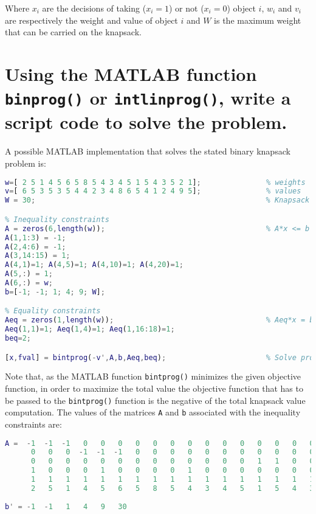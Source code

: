 Where $x_i$ are the decisions of taking ($x_i=1$) or not ($x_i=0$) object $i$, $w_i$ and $v_i$ are respectively the weight and value of object $i$ and $W$ is the maximum weight that can be carried on the knapsack. 
    
\section{Using the MATLAB function \texttt{binprog()} or \texttt{intlinprog()}, write a script code to solve the problem.}

A possible MATLAB implementation that solves the stated binary knapsack problem is:

\begin{lstlisting}[language=Matlab,frame=none]
% Object data
w=[ 2 5 1 4 5 6 5 8 5 4 3 4 5 1 5 4 3 5 2 1]; 				% weights
v=[ 6 5 3 5 3 5 4 4 2 3 4 8 6 5 4 1 2 4 9 5]; 				% values
W = 30;                                       				% Knapsack capacity

% Inequality constraints
A = zeros(6,length(w));                        				% A*x <= b
A(1,1:3) = -1;
A(2,4:6) = -1;
A(3,14:15) = 1;
A(4,1)=1; A(4,5)=1; A(4,10)=1; A(4,20)=1;
A(5,:) = 1;
A(6,:) = w;
b=[-1; -1; 1; 4; 9; W];

% Equality constraints
Aeq = zeros(1,length(w));                      				% Aeq*x = beq
Aeq(1,1)=1; Aeq(1,4)=1; Aeq(1,16:18)=1;
beq=2;

[x,fval] = bintprog(-v',A,b,Aeq,beq);						% Solve program
\end{lstlisting}

Note that, as the MATLAB function \texttt{bintprog()} minimizes the given objective function, in order to maximize the total value the objective function that has to be passed to the \texttt{bintprog()} function is the negative of the total knapsack value computation.  
\newpage
The values of the matrices \texttt{A} and \texttt{b} associated with the inequality constraints are:
\begin{lstlisting}[language=Matlab,frame=none]
A =  -1  -1  -1   0   0   0   0   0   0   0   0   0   0   0   0   0   0   0   0   0   
      0   0   0  -1  -1  -1   0   0   0   0   0   0   0   0   0   0   0   0   0   0
      0   0   0   0   0   0   0   0   0   0   0   0   0   1   1   0   0   0   0   0
      1   0   0   0   1   0   0   0   0   1   0   0   0   0   0   0   0   0   0   1
      1   1   1   1   1   1   1   1   1   1   1   1   1   1   1   1   1   1   1   1
      2   5   1   4   5   6   5   8   5   4   3   4   5   1   5   4   3   5   2   1
     
b' = -1  -1   1   4   9   30
\end{lstlisting}

